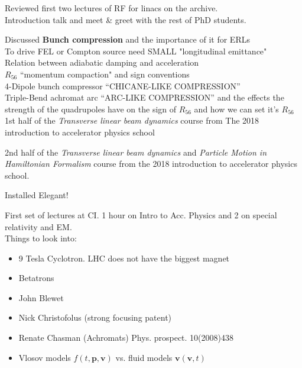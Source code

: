 
Reviewed first two lectures of RF for linacs on the archive.\\
Introduction talk and meet \& greet with the rest of PhD students.\\


Discussed \textbf{Bunch compression} and the importance of it for ERLs\\
To drive FEL or Compton source need SMALL "longitudinal emittance"\\
Relation between adiabatic damping and acceleration\\
$R_{56}$ ``momentum compaction" and sign conventions \\
4-Dipole bunch compressor ``CHICANE-LIKE COMPRESSION''\\
Triple-Bend achromat arc ``ARC-LIKE COMPRESSION'' and the effects the strength of the quadrupoles have on the sign of $R_{56}$ and how we can set it's $R_{56}$\\

1st half of the \emph{Transverse linear beam dynamics} course from The 2018 introduction to accelerator physics school


2nd half of the \emph{Transverse linear beam dynamics} and \emph{Particle Motion in Hamiltonian Formalism} course from the 2018 introduction to accelerator physics school.



Installed Elegant!



First set of lectures at CI. 1 hour on Intro to Acc. Physics and 2 on special relativity and EM.\\
Things to look into:
\begin{itemize}
    \item 9 Tesla Cyclotron. LHC does not have the biggest magnet
    \item Betatrons
    \item John Blewet
    \item Nick Christofolus (strong focusing patent)
    \item Renate Chasman (Achromats) Phys. prospect. 10(2008)438\\ \HRule
    \item Vlosov models $f(t,\textbf{p},\textbf{v})$ vs. fluid models $\textbf{v}(\textbf{v},t)$
\end{itemize}


